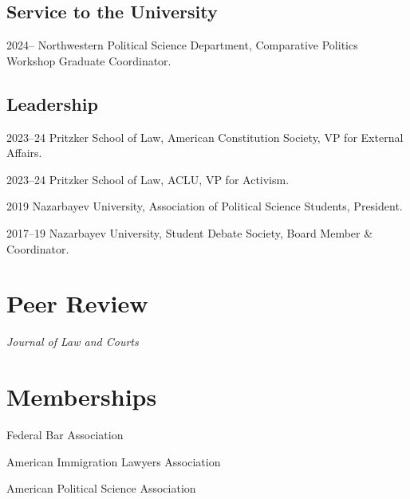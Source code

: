 \documentclass[11pt,letterpaper]{report}
\newcommand{\listitemspace}{0.25em}
\renewenvironment{itemize}
{\begin{list}{}{\setlength{\leftmargin}{0em}
                \setlength{\parskip}{0em}
                \setlength{\itemsep}{\listitemspace}
                \setlength{\parsep}{\listitemspace}}}
{\end{list}}
\begin{document}
   

    \subsection*{Service to the University}

    \begin{tablist}
        \item[2024--]   \tab{}Northwestern Political Science Department, Comparative Politics Workshop Graduate Coordinator.
        
    \end{tablist}


    \subsection*{Leadership}

    \begin{tablist}
        \item[2023--24] \tab{}Pritzker School of Law, American Constitution Society, VP for External Affairs.
        \item[2023--24] \tab{}Pritzker School of Law, ACLU, VP for Activism.
        \item[2019] \tab{} Nazarbayev University, Association of Political Science Students, President.
        \item[2017--19] \tab{} Nazarbayev University, Student Debate Society, Board Member \& Coordinator.
    \end{tablist}


   



    \section*{Peer Review}


    \begin{itemize}

        \item \textit{Journal of Law and Courts}
      

    \end{itemize}

  



    \section*{Memberships}

    \begin{itemize}

        \item Federal Bar Association
        \item American Immigration Lawyers Association
        \item American Political Science Association

    \end{itemize}
\end{document}
